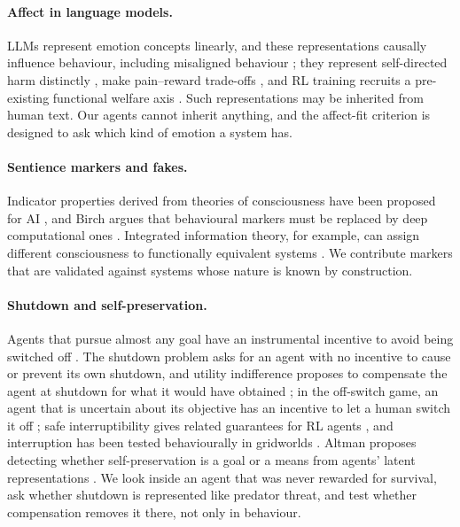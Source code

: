 \documentclass[11pt]{article}
\begin{document}
\paragraph{Affect in language models.} LLMs represent emotion concepts linearly, and these representations causally influence behaviour, including misaligned behaviour \cite{anthropic2026emotion}; they represent self-directed harm distinctly \cite{tagliabue2026pain}, make pain--reward trade-offs \cite{keeling2024tradeoffs,bianco2026tracing}, and RL training recruits a pre-existing functional welfare axis \cite{han2026welfare}. Such representations may be inherited from human text. Our agents cannot inherit anything, and the affect-fit criterion is designed to ask which kind of emotion a system has.

\paragraph{Sentience markers and fakes.} Indicator properties derived from theories of consciousness have been proposed for AI \cite{butlin2023consciousness}, and Birch argues that behavioural markers must be replaced by deep computational ones \cite{birch2024edge}. Integrated information theory, for example, can assign different consciousness to functionally equivalent systems \cite{findlay2024dissociating}. We contribute markers that are validated against systems whose nature is known by construction.

\paragraph{Shutdown and self-preservation.} Agents that pursue almost any goal have an instrumental incentive to avoid being switched off \cite{omohundro2008drives,turner2021power}. The shutdown problem asks for an agent with no incentive to cause or prevent its own shutdown, and utility indifference proposes to compensate the agent at shutdown for what it would have obtained \cite{soares2015corrigibility}; in the off-switch game, an agent that is uncertain about its objective has an incentive to let a human switch it off \cite{hadfieldmenell2017offswitch}; safe interruptibility gives related guarantees for RL agents \cite{orseau2016interruptible}, and interruption has been tested behaviourally in gridworlds \cite{leike2017gridworlds}. Altman proposes detecting whether self-preservation is a goal or a means from agents' latent representations \cite{altman2026continuation}. We look inside an agent that was never rewarded for survival, ask whether shutdown is represented like predator threat, and test whether compensation removes it there, not only in behaviour.
\end{document}
